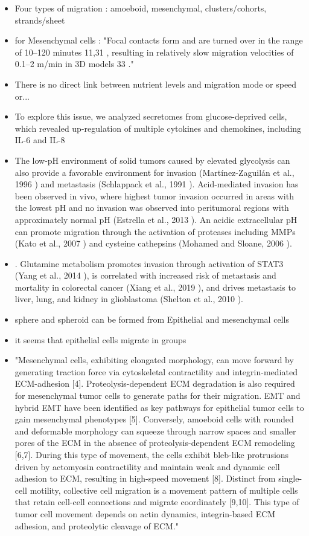 \documentclass[11pt,a4paper]{article}
\begin{document}
\begin{itemize}
\item Four types of migration : amoeboid, mesenchymal, clusters/cohorts, strands/sheet\cite{Friedl2003}
\item for Mesenchymal cells : "Focal contacts
form and are turned over in the range of 10–120
minutes 11,31 , resulting in relatively slow migration
velocities of 0.1–2 \textmu m/min in 3D models 33 ."\cite{Friedl2003}
\item There is no direct link between nutrient levels and migration mode or speed or...
\item To explore this issue, we analyzed secretomes from glucose-deprived cells, which revealed up-regulation of multiple cytokines and chemokines, including IL-6 and IL-8\cite{Puschel2020}
\item The low-pH environment of solid tumors caused by elevated glycolysis can also provide a favorable environment for invasion (Martínez-Zaguilán et al., 1996
) and metastasis (Schlappack et al., 1991
). Acid-mediated invasion has been observed in vivo, where highest tumor invasion occurred in areas with the lowest pH and no invasion was observed into peritumoral regions with approximately normal pH (Estrella et al., 2013
). An acidic extracellular pH can promote migration through the activation of proteases including MMPs (Kato et al., 2007
) and cysteine cathepsins (Mohamed and Sloane, 2006
). \cite{Zanotelli2021}
\item . Glutamine metabolism promotes invasion through activation of STAT3 (Yang et al., 2014
), is correlated with increased risk of metastasis and mortality in colorectal cancer (Xiang et al., 2019
), and drives metastasis to liver, lung, and kidney in glioblastoma (Shelton et al., 2010
).\cite{Zanotelli2021}
\item sphere and spheroid can be formed from Epithelial and mesenchymal cells
\item it seems that epithelial cells migrate in groups
\item "Mesenchymal cells, exhibiting elongated morphology, can move forward by generating traction force via cytoskeletal contractility and integrin-mediated ECM-adhesion [4]. Proteolysis-dependent ECM degradation is also required for mesenchymal tumor cells to generate paths for their migration. EMT and hybrid EMT have been identified as key pathways for epithelial tumor cells to gain mesenchymal phenotypes [5]. Conversely, amoeboid cells with rounded and deformable morphology can squeeze through narrow spaces and smaller pores of the ECM in the absence of proteolysis-dependent ECM remodeling [6,7]. During this type of movement, the cells exhibit bleb-like protrusions driven by actomyosin contractility and maintain weak and dynamic cell adhesion to ECM, resulting in high-speed movement [8]. Distinct from single-cell motility, collective cell migration is a movement pattern of multiple cells that retain cell-cell connections and migrate coordinately [9,10]. This type of tumor cell movement depends on actin dynamics, integrin-based ECM adhesion, and proteolytic cleavage of ECM."\cite{Wu2021}

\end{itemize}
\end{document}
